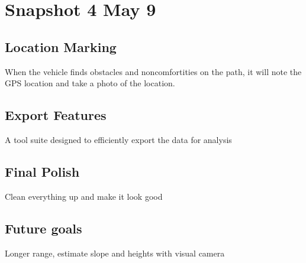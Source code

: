 \documentclass[12pt]{article}
\begin{document}
\section{Snapshot 4 May 9}
\subsection{Location Marking}
When the vehicle finds obstacles and noncomfortities on the path, it will note the GPS location and take a photo of the location. 
\subsection{Export Features}
A tool suite designed to efficiently export the data for analysis
\subsection{Final Polish}
Clean everything up and make it look good
\subsection{Future goals}
Longer range, estimate slope and heights with visual camera
\end{document}
